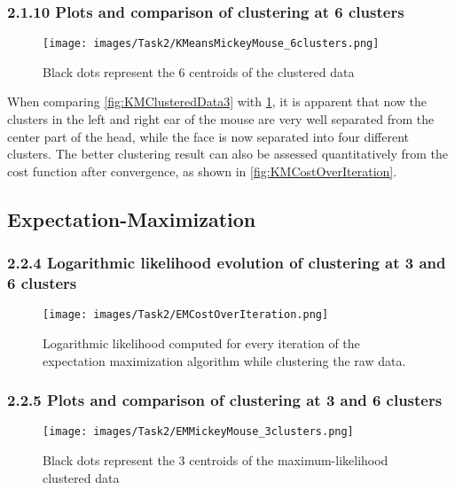 \subsubsection*{2.1.10 Plots and comparison of clustering at 6 clusters}


\begin{figure}[H]
	\centering
	\texttt{[image: images/Task2/KMeansMickeyMouse\_6clusters.png]}
	\caption{Black dots represent the 6 centroids of the clustered data}
	\label{fig:KMClusteredData6}
\end{figure}

When comparing \cref{fig:KMClusteredData3} with \cref{fig:KMClusteredData6}, it is apparent that now the clusters in the left and right ear of the mouse are very well separated from the center part of the head, while the face is now separated into four different clusters. The better clustering result can also be assessed quantitatively from the cost function after convergence, as shown in \cref{fig:KMCostOverIteration}.






\subsection{Expectation-Maximization}
\subsubsection*{2.2.4 Logarithmic likelihood evolution of clustering at 3 and 6 clusters}

\begin{figure}[H]
	\centering
	\texttt{[image: images/Task2/EMCostOverIteration.png]}
	\caption{Logarithmic likelihood computed for every iteration of the expectation maximization algorithm while clustering the raw data.}
	\label{fig:EMCostOverIteration}
\end{figure}



\subsubsection*{2.2.5 Plots and comparison of clustering at 3 and 6 clusters}

\begin{figure}[H]
	\centering
	\texttt{[image: images/Task2/EMMickeyMouse\_3clusters.png]}
	\caption{Black dots represent the 3 centroids of the maximum-likelihood clustered data}
	\label{fig:EMClusteredData3}
\end{figure}



